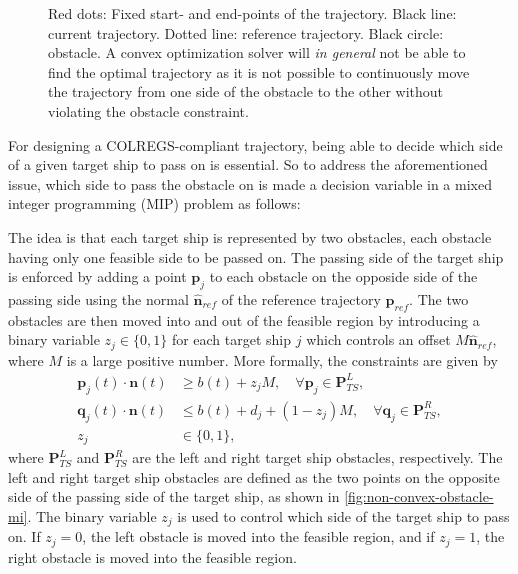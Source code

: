 \begin{figure}
    \centering
    
    \caption{Red dots: Fixed start- and end-points of the trajectory. Black line: current trajectory. Dotted line: reference trajectory. Black circle: obstacle. A convex optimization solver will \emph{in general} not be able to find the optimal trajectory as it is not possible to continuously move the trajectory from one side of the obstacle to the other without violating the obstacle constraint.}
    \label{fig:non-convex-obstacle}
\end{figure}

For designing a COLREGS-compliant trajectory, being able to decide which side of a given target ship to pass on is essential. So to address the aforementioned issue, which side to pass the obstacle on is made a decision variable in a mixed integer programming (MIP) problem as follows:

The idea is that each target ship is represented by two obstacles, each obstacle having only one feasible side to be passed on. The passing side of the target ship is enforced by adding a point $\mathbf p_j$ to each obstacle on the opposide side of the passing side using the normal $\mathbf{\hat n}_{ref}$ of the reference trajectory $\mathbf p_{ref}$. The two obstacles are then moved into and out of the feasible region by introducing a binary variable $z_j\in\{0,1\}$ for each target ship $j$ which controls an offset $M \mathbf{\hat n}_{ref}$, where $M$ is a large positive number. More formally, the constraints are given by
\begin{subequations}\label{eq:colregs-constraints}
    \begin{align}
        \mathbf p_{j}(t) \cdot{\mathbf n}(t) &\ge b(t) + z_j M, \quad\forall \mathbf p_j\in\mathbf P_{TS}^L, \label{eq:colregs-left} \\
        \mathbf q_{j}(t) \cdot{\mathbf n}(t) &\le b(t) + d_{j} + (1 - z_j) M, \quad\forall \mathbf q_j\in\mathbf P_{TS}^R, \label{eq:colregs-right} \\
        z_j &\in \{0,1\}, \label{eq:colregs-binary}
    \end{align}
\end{subequations}
where $\mathbf P_{TS}^L$ and $\mathbf P_{TS}^R$ are the left and right target ship obstacles, respectively. The left and right target ship obstacles are defined as the two points on the opposite side of the passing side of the target ship, as shown in \cref{fig:non-convex-obstacle-mi}. The binary variable $z_j$ is used to control which side of the target ship to pass on. If $z_j = 0$, the left obstacle is moved into the feasible region, and if $z_j = 1$, the right obstacle is moved into the feasible region.

